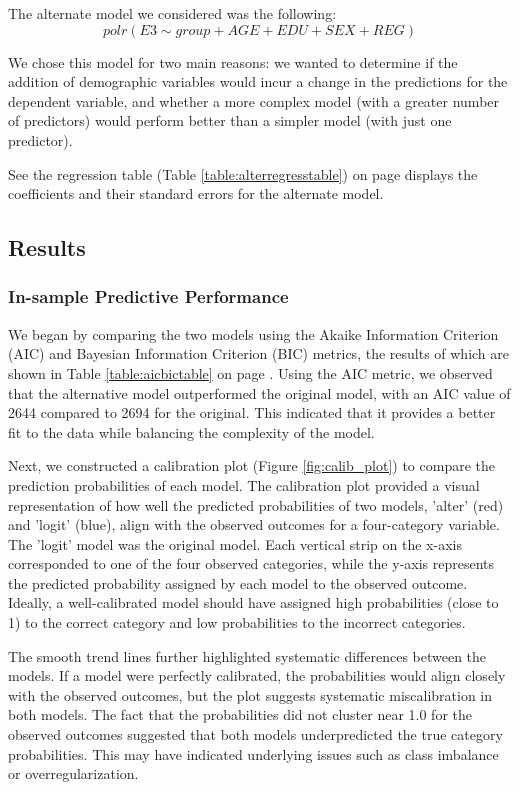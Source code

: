 \documentclass[titlepage]{article}
\begin{document}
\justify
The alternate model we considered was the following:
\begin{equation}
polr(E3 \sim group + AGE + EDU + SEX + REG)
\end{equation}

We chose this model for two main reasons: we wanted to determine if the addition of demographic variables would incur a change in the predictions for the dependent variable, and whether a more complex model (with a greater number of predictors) would perform better than a simpler model (with just one predictor).

\justify
See the regression table (Table \ref{table:alterregresstable}) on page \pageref{table:alterregresstable} displays the coefficients and their standard errors for the alternate model.

\subsection{Results}
\subsubsection{In-sample Predictive Performance}
We began by comparing the two models using the Akaike Information Criterion (AIC) and Bayesian Information Criterion (BIC) metrics, the results of which are shown in Table \ref{table:aicbictable} on page \pageref{table:aicbictable}. Using the AIC metric, we observed that the alternative model outperformed the original model, with an AIC value of 2644 compared to 2694 for the original. This indicated that it provides a better fit to the data while balancing the complexity of the model.

\justify
Next, we constructed a calibration plot (Figure \ref{fig:calib_plot}) to compare the prediction probabilities of each model. The calibration plot provided a visual representation of how well the predicted probabilities of two models, 'alter' (red) and 'logit' (blue), align with the observed outcomes for a four-category variable. The 'logit' model was the original model. Each vertical strip on the x-axis corresponded to one of the four observed categories, while the y-axis represents the predicted probability assigned by each model to the observed outcome. Ideally, a well-calibrated model should have assigned high probabilities (close to 1) to the correct category and low probabilities to the incorrect categories.

\justify
The smooth trend lines further highlighted systematic differences between the models. If a model were perfectly calibrated, the probabilities would align closely with the observed outcomes, but the plot suggests systematic miscalibration in both models. The fact that the probabilities did not cluster near 1.0 for the observed outcomes suggested that both models underpredicted the true category probabilities. This may have indicated underlying issues such as class imbalance or overregularization.
\end{document}
